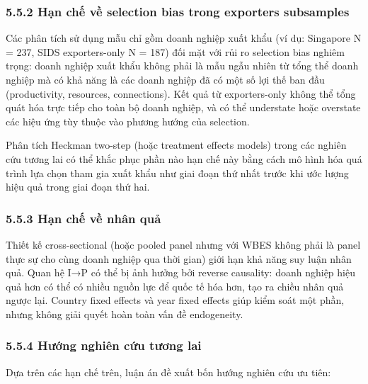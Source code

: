 \documentclass[12pt,a4paper]{article}
\begin{document}
\hypertarget{552-hux1ea1n-chux1ebf-vux1ec1-selection-bias-trong-exporters-subsamples}{%
\subsubsection{5.5.2 Hạn chế về selection bias trong exporters
subsamples}\label{552-hux1ea1n-chux1ebf-vux1ec1-selection-bias-trong-exporters-subsamples}}

Các phân tích sử dụng mẫu chỉ gồm doanh nghiệp xuất khẩu (ví dụ:
Singapore N = 237, SIDS exporters-only N = 187) đối mặt với rủi ro
selection bias nghiêm trọng: doanh nghiệp xuất khẩu không phải là mẫu
ngẫu nhiên từ tổng thể doanh nghiệp mà có khả năng là các doanh nghiệp
đã có một số lợi thế ban đầu (productivity, resources, connections). Kết
quả từ exporters-only không thể tổng quát hóa trực tiếp cho toàn bộ
doanh nghiệp, và có thể understate hoặc overstate các hiệu ứng tùy thuộc
vào phương hướng của selection.

Phân tích Heckman two-step (hoặc treatment effects models) trong các
nghiên cứu tương lai có thể khắc phục phần nào hạn chế này bằng cách mô
hình hóa quá trình lựa chọn tham gia xuất khẩu như giai đoạn thứ nhất
trước khi ước lượng hiệu quả trong giai đoạn thứ hai.

\hypertarget{553-hux1ea1n-chux1ebf-vux1ec1-nhuxe2n-quux1ea3}{%
\subsubsection{5.5.3 Hạn chế về nhân
quả}\label{553-hux1ea1n-chux1ebf-vux1ec1-nhuxe2n-quux1ea3}}

Thiết kế cross-sectional (hoặc pooled panel nhưng với WBES không phải là
panel thực sự cho cùng doanh nghiệp qua thời gian) giới hạn khả năng suy
luận nhân quả. Quan hệ I→P có thể bị ảnh hưởng bởi reverse causality:
doanh nghiệp hiệu quả hơn có thể có nhiều nguồn lực để quốc tế hóa hơn,
tạo ra chiều nhân quả ngược lại. Country fixed effects và year fixed
effects giúp kiểm soát một phần, nhưng không giải quyết hoàn toàn vấn đề
endogeneity.

\hypertarget{554-hux1b0ux1edbng-nghiuxean-cux1ee9u-tux1b0ux1a1ng-lai}{%
\subsubsection{5.5.4 Hướng nghiên cứu tương
lai}\label{554-hux1b0ux1edbng-nghiuxean-cux1ee9u-tux1b0ux1a1ng-lai}}

Dựa trên các hạn chế trên, luận án đề xuất bốn hướng nghiên cứu ưu tiên:
\end{document}
